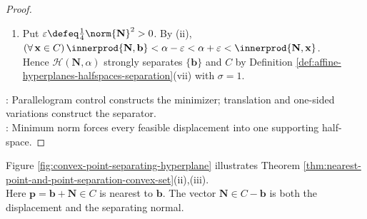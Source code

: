 \begin{theorem}
\begin{proof}
\begin{enumerate}[label=(\roman*)]
Hence $\innerprod{\mathbf{N},\mathbf{z}}\geq\norm{\mathbf{N}}^2$. Substituting $\mathbf{z}=\mathbf{x}-\mathbf{b}$ proves $\innerprod{\mathbf{N},C}\geq\norm{\mathbf{N}}^2+\innerprod{\mathbf{N},\mathbf{b}}>\innerprod{\mathbf{N},\mathbf{b}}$.
\item Put $\varepsilon\defeq\frac{1}{4}\norm{\mathbf{N}}^2>0$. By (ii), $(\forall\,\mathbf{x}\in C)\,\innerprod{\mathbf{N},\mathbf{b}}<\alpha-\varepsilon<\alpha+\varepsilon<\innerprod{\mathbf{N},\mathbf{x}}$.\\
Hence $\mathcal{H}(\mathbf{N},\alpha)$ strongly separates $\{\mathbf{b}\}$ and $C$ by Definition \ref{def:affine-hyperplanes-halfspaces-separation}(vii) with $\sigma=1$.
\end{enumerate}
: Parallelogram control constructs the minimizer; translation and one-sided variations construct the separator.\\
: Minimum norm forces every feasible displacement into one supporting half-space.
\end{proof}
\end{theorem}

Figure \ref{fig:convex-point-separating-hyperplane} illustrates Theorem \ref{thm:nearest-point-and-point-separation-convex-set}(ii),(iii).\\
Here $\mathbf{p}=\mathbf{b}+\mathbf{N}\in C$ is nearest to $\mathbf{b}$. The vector $\mathbf{N}\in C-\mathbf{b}$ is both the displacement and the separating normal.

\begin{illustrationfigure}[H]
  \centering
  
  \caption{For $\mathbf{b}\notin C$, the labeled point $\mathbf{p}=\mathbf{b}+\mathbf{N}\in C$ is nearest to $\mathbf{b}$, the arrow $\mathbf{N}$ is the displacement from $\mathbf{b}$ to $\mathbf{p}$, and the labeled hyperplane lies strictly between $\mathbf{b}$ and the closed convex set $C$.}
  \label{fig:convex-point-separating-hyperplane}
\end{illustrationfigure}

